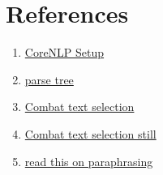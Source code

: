 \documentclass{article}
\begin{document}
\section{References}
\begin{enumerate}
    \item \href{https://bbengfort.github.io/2018/06/corenlp-nltk-parses/}{CoreNLP Setup}
    \item \href{https://stackoverflow.com/questions/42322902/how-to-get-parse-tree-using-python-nltk}{parse tree}
    \item \href{https://tex.stackexchange.com/questions/507288/minted-make-text-non-selectable-on-output-pdf}{Combat text selection}
    \item \href{https://stackoverflow.com/questions/28797418/replace-all-font-glyphs-in-a-pdf-by-converting-them-to-outline-shapes}{Combat text selection still}
    \item \href{https://lopezyse.medium.com/paraphrasing-in-natural-language-processing-nlp-857c28e68488}{read this on paraphrasing}
\end{enumerate}
\end{document}
